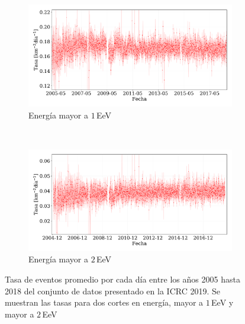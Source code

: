   \begin{figure}[H]
       \centering
       \begin{subfigure}[b]{0.9\textwidth}
       \includegraphics[width=\textwidth]{Graphs/rate_dayly/herald_above_1EeV_rate_day.pdf}
       \caption{Energía mayor a $1\,$EeV}
       \label{fig:rate_day_ICRC_19_05_18}
       \end{subfigure}\\
       \begin{subfigure}[b]{0.9\textwidth}
       \includegraphics[width=\textwidth]{Graphs/rate_dayly/herald_above_2EeV_rate_day.pdf}
       \caption{ Energía mayor a $2\,$EeV}
       \label{fig:rate_2015_ICRC_19_05_18}
       \end{subfigure}%
       \caption{Tasa de eventos promedio por cada día entre los años 2005 hasta 2018 del conjunto de datos presentado en la ICRC 2019. Se muestran las tasas para dos cortes en energía, mayor a $1\,$EeV y mayor a $2\,$EeV}\label{fig:rate_new_18}
   \end{figure}
